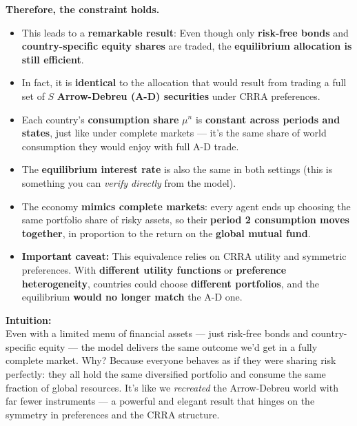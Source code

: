 \documentclass[12pt]{article}
\begin{document}
\begin{itemize}
{\textbf{Therefore, the constraint holds.} 
}

\begin{itemize}
    \item This leads to a \textbf{remarkable result}: Even though only \textbf{risk-free bonds} and \textbf{country-specific equity shares} are traded, the \textbf{equilibrium allocation is still efficient}.

    \item In fact, it is \textbf{identical} to the allocation that would result from trading a full set of \( S \) \textbf{Arrow-Debreu (A-D) securities} under CRRA preferences.

    \item Each country’s \textbf{consumption share} \( \mu^n \) is \textbf{constant across periods and states}, just like under complete markets — it’s the same share of world consumption they would enjoy with full A-D trade.

    \item The \textbf{equilibrium interest rate} is also the same in both settings (this is something you can \textit{verify directly} from the model).

    \item The economy \textbf{mimics complete markets}: every agent ends up choosing the same portfolio share of risky assets, so their \textbf{period 2 consumption moves together}, in proportion to the return on the \textbf{global mutual fund}.

    \item \textbf{Important caveat:} This equivalence relies on CRRA utility and symmetric preferences. With \textbf{different utility functions} or \textbf{preference heterogeneity}, countries could choose \textbf{different portfolios}, and the equilibrium \textbf{would no longer match} the A-D one.
\end{itemize}

\vspace{1em}
\textbf{Intuition:} \\
Even with a limited menu of financial assets — just risk-free bonds and country-specific equity — the model delivers the same outcome we’d get in a fully complete market. Why? Because everyone behaves as if they were sharing risk perfectly: they all hold the same diversified portfolio and consume the same fraction of global resources. It’s like we \textit{recreated} the Arrow-Debreu world with far fewer instruments — a powerful and elegant result that hinges on the symmetry in preferences and the CRRA structure.


\end{itemize}
\end{document}
